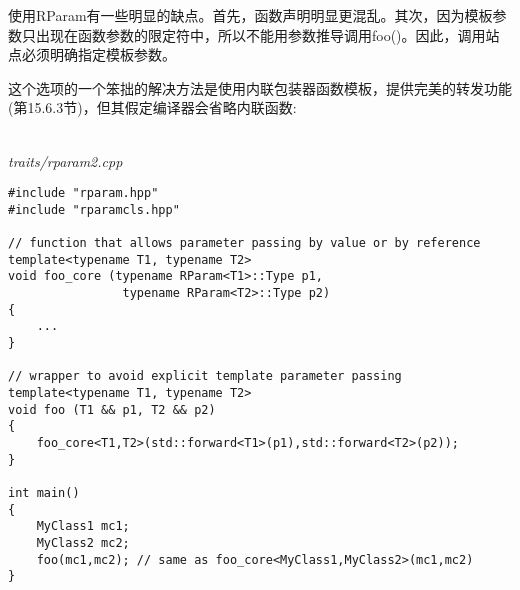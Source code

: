 使用RParam有一些明显的缺点。首先，函数声明明显更混乱。其次，因为模板参数只出现在函数参数的限定符中，所以不能用参数推导调用foo()。因此，调用站点必须明确指定模板参数。

这个选项的一个笨拙的解决方法是使用内联包装器函数模板，提供完美的转发功能(第15.6.3节)，但其假定编译器会省略内联函数:

\hspace*{\fill} \\ %
\noindent
\textit{traits/rparam2.cpp}
\begin{lstlisting}[style=styleCXX]
#include "rparam.hpp"
#include "rparamcls.hpp"

// function that allows parameter passing by value or by reference
template<typename T1, typename T2>
void foo_core (typename RParam<T1>::Type p1,
				typename RParam<T2>::Type p2)
{
	...
}

// wrapper to avoid explicit template parameter passing
template<typename T1, typename T2>
void foo (T1 && p1, T2 && p2)
{
	foo_core<T1,T2>(std::forward<T1>(p1),std::forward<T2>(p2));
}

int main()
{
	MyClass1 mc1;
	MyClass2 mc2;
	foo(mc1,mc2); // same as foo_core<MyClass1,MyClass2>(mc1,mc2)
}
\end{lstlisting}












